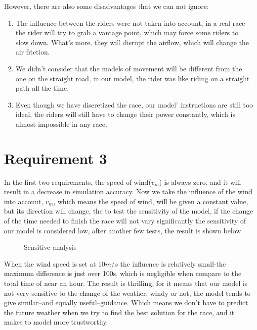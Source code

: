 \documentclass[12pt]{article}
\begin{document}
However, there are also some disadvantages that we can not ignore:
\begin{enumerate}
    \item The influence between the riders were not taken into account, in a real race the rider will try to grab a vantage point, which may force some riders to
          slow down. What's more, they will disrupt the airflow, which will change the air friction.%
    \item We didn't consider that the models of movement will be different from the one on the straight road, in our model, the rider was like riding on a straight path
          all the time.%
    \item Even though we have discretized the race, our model' instructions are still too ideal, the riders will still have to change their power constantly, which is
          almost impossible in any race. %
\end{enumerate}
\section{Requirement 3}
In the first two requirements, the speed of wind($v_m$) is always zero, and it will result in a decrease in simulation accuracy.
Now we take the influence of the wind into account,  $v_m$, which means the speed of wind, will be given a constant value, but its direction will change, the
to test the sensitivity of the model, if the change of the time needed to finish the race will not vary significantly the sensitivity of our model
is considered low, after another few tests, the result is shown below.
\begin{figure}
    \centering
    
    \caption{Sensitive analysis}
\end{figure}
When the wind speed is set at 10$m/s$ the influence is relatively small-the maximum difference is just over 100s, which is negligible when compare to the total time of
near an hour. The result is thrilling, for it means that our model is not very sensitive to the change of the weather, windy or not, the model tends to give similar--and
equally useful--guidance. Which means we don't have to predict the future weather when we try to find the best solution for the race, and it makes to model more trustworthy.
\end{document}
